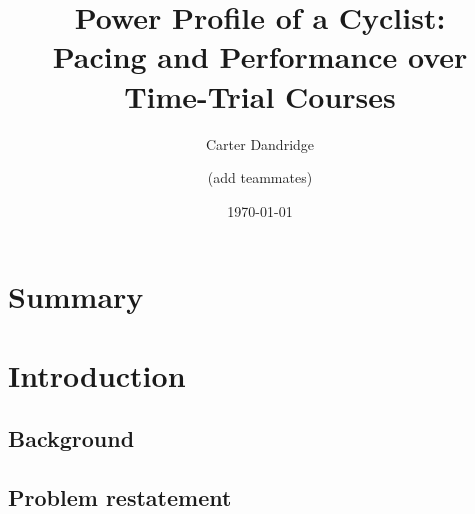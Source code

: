 \documentclass[11pt]{article}
\title{Power Profile of a Cyclist:\\ Pacing and Performance over Time-Trial Courses}
\author{Carter Dandridge \and (add teammates)}
\date{\today}
\begin{document}
\maketitle

\section*{Summary}

\section{Introduction}

\subsection{Background}

\subsection{Problem restatement}
\end{document}
